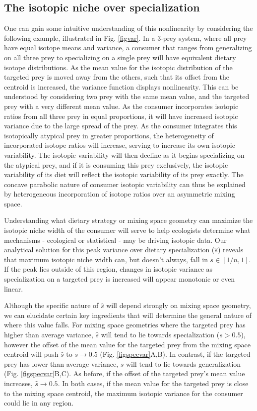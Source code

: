 \documentclass{frontiersSCNS}
\begin{document}
\subsection{The isotopic niche over specialization}
One can gain some intuitive understanding of this nonlinearity by considering the following example, illustrated in Fig. \ref{figvar}.
In a 3-prey system, where all prey have equal isotope means and variance, a consumer that ranges from generalizing on all three prey to specializing on a single prey will have equivalent dietary isotope distributions.
As the mean value for the isotopic distribution of the targeted prey is moved away from the others, such that its offset from the centroid is increased, the variance function displays nonlinearity.
This can be understood by considering two prey with the same mean value, and the targeted prey with a very different mean value.
As the consumer incorporates isotopic ratios from all three prey in equal proportions, it will have increased isotopic variance due to the large spread of the prey.
As the consumer integrates this isotopically atypical prey in greater proportions, the heterogeneity of incorporated isotope ratios will increase, serving to increase its own isotopic variability.
The isotopic variability will then decline as it begins specializing on the atypical prey, and if it is consuming this prey exclusively, the isotopic variability of its diet will reflect the isotopic variability of its prey exactly.
The concave parabolic nature of consumer isotopic variability can thus be explained by heterogeneous incorporation of isotope ratios over an asymmetric mixing space.


Understanding what dietary strategy or mixing space geometry can maximize the isotopic niche width of the consumer will serve to help ecologists determine what mechanisms - ecological or statistical - may be driving isotopic data.
Our analytical solution for this peak variance over dietary specialization ($\hat s$) reveals that maximum isotopic niche width can, but doesn't always, fall in $s \in [1/n,1]$.
If the peak lies outside of this region, changes in isotopic variance as specialization on a targeted prey is increased will appear monotonic or even linear.

Although the specific nature of $\hat s$ will depend strongly on mixing space geometry, we can elucidate certain key ingredients that will determine the general nature of where this value falls.
For mixing space geometries where the targeted prey has higher than average variance, $\hat s$ will tend to lie towards specialization ($s>0.5$), however the offset of the mean value for the targeted prey from the mixing space centroid will push $\hat s$ to $s \to 0.5$ (Fig. \ref{figspecvar}A,B).
In contrast, if the targeted prey has lower than average variance, $\hat s$ will tend to lie towards generalization (Fig. \ref{figspecvar}B,C).
As before, if the offset of the targeted prey's mean value increases, $\hat s \to 0.5$.
In both cases, if the mean value for the targeted prey is close to the mixing space centroid, the maximum isotopic variance for the consumer could lie in any region.
\end{document}
